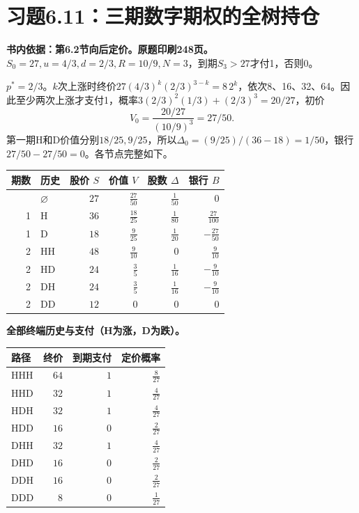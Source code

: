\documentclass[11pt,a4paper,UTF8,fontset=fandol]{ctexart}
\begin{document}
\bigskip

\section{习题6.11：三期数字期权的全树持仓}\label{ux4e60ux98986.11ux4e09ux671fux6570ux5b57ux671fux6743ux7684ux5168ux6811ux6301ux4ed3}

\textbf{书内依据：第6.2节向后定价。原题印刷248页。}\(S_0=27,u=4/3,d=2/3,R=10/9,N=3\)，到期\(S_3>27\)才付1，否则0。

\(p^*=2/3\)。\(k\)次上涨时终价\(27(4/3)^k(2/3)^{3-k}=8\,2^k\)，依次8、16、32、64。因此至少两次上涨才支付1，概率\(3(2/3)^2(1/3)+(2/3)^3=20/27\)，初价
\[\boxed{V_0=\frac{20/27}{(10/9)^3}=27/50.}\]
第一期H和D价值分别\(18/25,9/25\)，所以\(\Delta_0=(9/25)/(36-18)=1/50\)，银行\(27/50-27/50=0\)。各节点完整如下。

\begingroup
\small
\setlength{\tabcolsep}{4pt}
\renewcommand{\arraystretch}{1.10}

\begin{longtable}[]{@{}rlrrrr@{}}
\toprule\noalign{}
期数 & 历史 & 股价 \(S\) & 价值 \(V\) & 股数 \(\Delta\) & 银行 \(B\) \\
\midrule\noalign{}
\endhead
\bottomrule\noalign{}
\endlastfoot
0 & \(\varnothing\) & \(27\) & \(\frac{27}{50}\) & \(\frac{1}{50}\) &
\(0\) \\
1 & H & \(36\) & \(\frac{18}{25}\) & \(\frac{1}{80}\) &
\(\frac{27}{100}\) \\
1 & D & \(18\) & \(\frac{9}{25}\) & \(\frac{1}{20}\) &
\(-\frac{27}{50}\) \\
2 & HH & \(48\) & \(\frac{9}{10}\) & \(0\) & \(\frac{9}{10}\) \\
2 & HD & \(24\) & \(\frac{3}{5}\) & \(\frac{1}{16}\) &
\(-\frac{9}{10}\) \\
2 & DH & \(24\) & \(\frac{3}{5}\) & \(\frac{1}{16}\) &
\(-\frac{9}{10}\) \\
2 & DD & \(12\) & \(0\) & \(0\) & \(0\) \\
\end{longtable}

\textbf{全部终端历史与支付（H为涨，D为跌）。}

\begin{longtable}[]{@{}lrrr@{}}
\toprule\noalign{}
路径 & 终价 & 到期支付 & 定价概率 \\
\midrule\noalign{}
\endhead
\bottomrule\noalign{}
\endlastfoot
HHH & \(64\) & \(1\) & \(\frac{8}{27}\) \\
HHD & \(32\) & \(1\) & \(\frac{4}{27}\) \\
HDH & \(32\) & \(1\) & \(\frac{4}{27}\) \\
HDD & \(16\) & \(0\) & \(\frac{2}{27}\) \\
DHH & \(32\) & \(1\) & \(\frac{4}{27}\) \\
DHD & \(16\) & \(0\) & \(\frac{2}{27}\) \\
DDH & \(16\) & \(0\) & \(\frac{2}{27}\) \\
DDD & \(8\) & \(0\) & \(\frac{1}{27}\) \\
\end{longtable}
\end{document}
